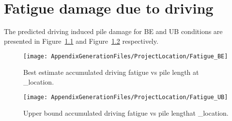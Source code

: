 \chapter{Fatigue damage due to driving}\label{sec_5}
The predicted driving induced pile damage for BE and UB conditions are
presented in Figure~\ref{fatigue_BE} and Figure~\ref{fatigue_UB} respectively.  

\begin{figure}[!htbp]
\texttt{[image: AppendixGenerationFiles/ProjectLocation/Fatigue\_BE]}
\caption{Best estimate accumulated driving fatigue vs pile length at {\ID_location}.}
\label{fatigue_BE}
\end{figure}

\begin{figure}[!htbp]
\texttt{[image: AppendixGenerationFiles/ProjectLocation/Fatigue\_UB]}
\caption{Upper bound accumulated driving fatigue vs pile lengthat {\ID_location}.}
\label{fatigue_UB}
\end{figure}